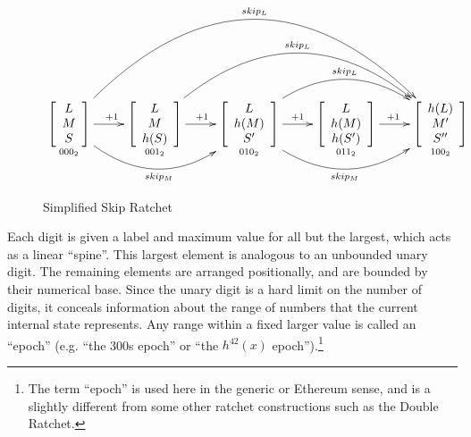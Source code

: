 \documentclass{article}
\begin{document}
	\begin{figure}[h]
		\centering
		
		$\xymatrix{
		    \underset{000_{2}}{\left[ { \begin{array}{cc} L \\ M  \\ S \end{array} } \right]}
				\ar[r]^{+1}
				\ar@/_3pc/[rr]_{skip_{M}}
				\ar@/^7pc/[rrrr]^{skip_{L}}
    	 & \underset{001_{2}}{\left[ { \begin{array}{cc} L \\ M  \\ h(S) \end{array} } \right]}
	      		\ar[r]^{+1}
	      		\ar@/^4.75pc/[rrr]^{skip_{L}}
	     & \underset{010_{2}}{\left[ { \begin{array}{cc} L \\ h(M)  \\ S' \end{array} } \right]}
	      		\ar[r]^{+1}
	      		\ar@/_3pc/[rr]_{skip_{M}}
	      		\ar@/^3pc/[rr]^{skip_{L}}
    	 & \underset{011_{2}}{\left[ { \begin{array}{cc} L \\ h(M)  \\ h(S') \end{array} } \right]}
	      		\ar[r]^{+1}
	     & \underset{100_{2}}{\left[ { \begin{array}{cc} h(L) \\ M'  \\ S'' \end{array} } \right]}
		}$

		\caption{Simplified Skip Ratchet}
		\label{fig:compound-ratchet}
	\end{figure}

	Each digit is given a label and maximum value for all but the largest, which acts as a linear ``spine''. This largest element is analogous to an unbounded unary digit. The remaining elements are arranged positionally, and are bounded by their numerical base. Since the unary digit is a hard limit on the number of digits, it conceals information about the range of numbers that the current internal state represents. Any range within a fixed larger value is called an ``epoch'' (e.g. ``the 300s epoch'' or ``the $h^{42}(x)$ epoch'').\footnote{The term ``epoch'' is used here in the generic or Ethereum\cite{ethereum-yellowpaper} sense, and is a slightly different from some other ratchet constructions such as the Double Ratchet\cite{double-ratchet-modularization}.}
	
\end{document}
